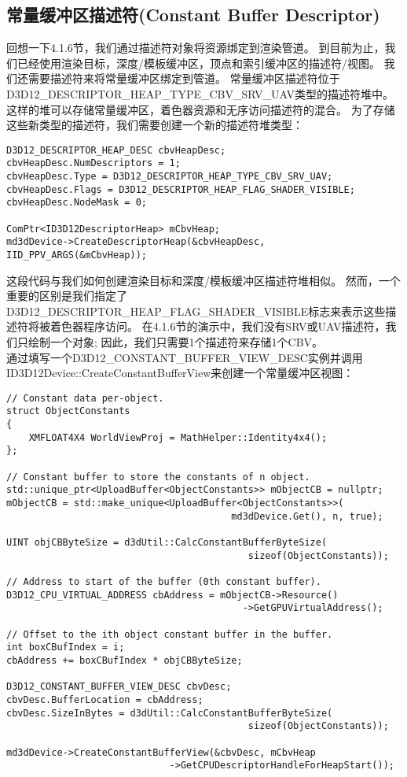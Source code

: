 \subsection{常量缓冲区描述符(Constant Buffer Descriptor)}
\begin{flushleft}
回想一下4.1.6节，我们通过描述符对象将资源绑定到渲染管道。 到目前为止，我们已经使用渲染目标，深度/模板缓冲区，顶点和索引缓冲区的描述符/视图。 我们还需要描述符来将常量缓冲区绑定到管道。 常量缓冲区描述符位于D3D12\_DESCRIPTOR\_HEAP\_TYPE\_CBV\_SRV\_UAV类型的描述符堆中。 这样的堆可以存储常量缓冲区，着色器资源和无序访问描述符的混合。 为了存储这些新类型的描述符，我们需要创建一个新的描述符堆类型：\\
\end{flushleft}
\begin{lstlisting}
D3D12_DESCRIPTOR_HEAP_DESC cbvHeapDesc;
cbvHeapDesc.NumDescriptors = 1;
cbvHeapDesc.Type = D3D12_DESCRIPTOR_HEAP_TYPE_CBV_SRV_UAV;
cbvHeapDesc.Flags = D3D12_DESCRIPTOR_HEAP_FLAG_SHADER_VISIBLE;
cbvHeapDesc.NodeMask = 0;

ComPtr<ID3D12DescriptorHeap> mCbvHeap;
md3dDevice->CreateDescriptorHeap(&cbvHeapDesc, IID_PPV_ARGS(&mCbvHeap));
\end{lstlisting}
\begin{flushleft}
这段代码与我们如何创建渲染目标和深度/模板缓冲区描述符堆相似。 然而，一个重要的区别是我们指定了D3D12\_DESCRIPTOR\_HEAP\_FLAG\_SHADER\_VISIBLE标志来表示这些描述符将被着色器程序访问。 在4.1.6节的演示中，我们没有SRV或UAV描述符，我们只绘制一个对象; 因此，我们只需要1个描述符来存储1个CBV。\\
通过填写一个D3D12\_CONSTANT\_BUFFER\_VIEW\_DESC实例并调用ID3D12Device::CreateConstantBufferView来创建一个常量缓冲区视图：\\
\end{flushleft}
\begin{lstlisting}
// Constant data per-object.
struct ObjectConstants
{
    XMFLOAT4X4 WorldViewProj = MathHelper::Identity4x4();
};

// Constant buffer to store the constants of n object.
std::unique_ptr<UploadBuffer<ObjectConstants>> mObjectCB = nullptr;
mObjectCB = std::make_unique<UploadBuffer<ObjectConstants>>(
                                        md3dDevice.Get(), n, true);

UINT objCBByteSize = d3dUtil::CalcConstantBufferByteSize(
                                           sizeof(ObjectConstants));

// Address to start of the buffer (0th constant buffer).
D3D12_CPU_VIRTUAL_ADDRESS cbAddress = mObjectCB->Resource()
                                          ->GetGPUVirtualAddress();

// Offset to the ith object constant buffer in the buffer.
int boxCBufIndex = i;
cbAddress += boxCBufIndex * objCBByteSize;

D3D12_CONSTANT_BUFFER_VIEW_DESC cbvDesc;
cbvDesc.BufferLocation = cbAddress;
cbvDesc.SizeInBytes = d3dUtil::CalcConstantBufferByteSize(
                                           sizeof(ObjectConstants));

md3dDevice->CreateConstantBufferView(&cbvDesc, mCbvHeap
                             ->GetCPUDescriptorHandleForHeapStart());
\end{lstlisting}
